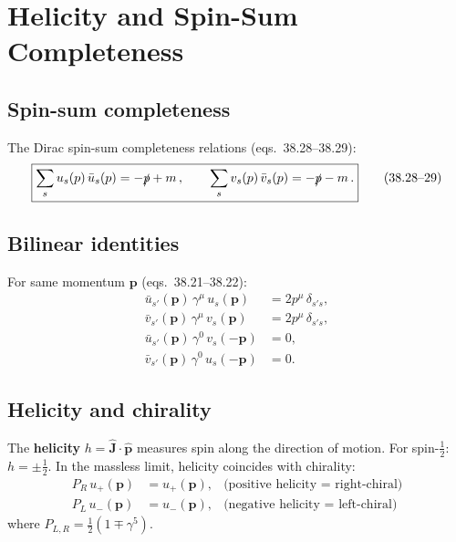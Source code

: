 
\section{Helicity and Spin-Sum Completeness}

\subsection{Spin-sum completeness}

The Dirac spin-sum completeness relations (eqs.~38.28--38.29):
\begin{equation}
  \boxed{
    \sum_s u_s(p)\,\bar u_s(p) = -\slashed{p} + m\,,
    \qquad
    \sum_s v_s(p)\,\bar v_s(p) = -\slashed{p} - m\,.
  }
  \tag{38.28--29}
\end{equation}

\subsection{Bilinear identities}

For same momentum $\mathbf{p}$ (eqs.~38.21--38.22):
\begin{align}
  \bar u_{s'}(\mathbf{p})\,\gamma^\mu\,u_s(\mathbf{p})
    &= 2p^\mu\,\delta_{s's}, \tag{38.21a}\\
  \bar v_{s'}(\mathbf{p})\,\gamma^\mu\,v_s(\mathbf{p})
    &= 2p^\mu\,\delta_{s's}, \tag{38.21b}\\
  \bar u_{s'}(\mathbf{p})\,\gamma^0\,v_s(-\mathbf{p})
    &= 0, \tag{38.22a}\\
  \bar v_{s'}(\mathbf{p})\,\gamma^0\,u_s(-\mathbf{p})
    &= 0. \tag{38.22b}
\end{align}

\subsection{Helicity and chirality}

The \textbf{helicity} $h = \hat{\mathbf{J}}\cdot\hat{\mathbf{p}}$ measures spin
along the direction of motion.  For spin-$\tfrac{1}{2}$: $h = \pm\tfrac{1}{2}$.
In the massless limit, helicity coincides with chirality:
\begin{align}
  P_R\,u_+(\mathbf{p}) &= u_+(\mathbf{p}), & \text{(positive helicity = right-chiral)}\\
  P_L\,u_-(\mathbf{p}) &= u_-(\mathbf{p}), & \text{(negative helicity = left-chiral)}
\end{align}
where $P_{L,R} = \tfrac{1}{2}(1\mp\gamma^5)$.

